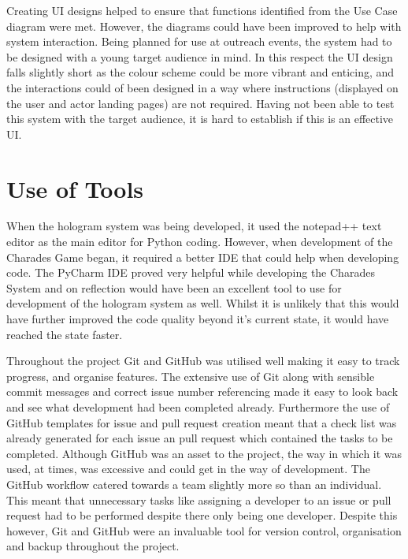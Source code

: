 Creating UI designs helped to ensure that functions identified from the Use Case diagram were met. However, the diagrams could have been improved to help with system interaction. Being planned for use at outreach events, the system had to be designed with a young target audience in mind. In this respect the UI design falls slightly short as the colour scheme could be more vibrant and enticing, and the interactions could of been designed in a way where instructions (displayed on the user and actor landing pages) are not required. Having not been able to test this system with the target audience, it is hard to establish if this is an effective UI.

\section{Use of Tools}
When the hologram system was being developed, it used the notepad++ text editor as the main editor for Python coding. However, when development of the Charades Game began, it required a better IDE that could help when developing code. The PyCharm IDE proved very helpful while developing the Charades System and on reflection would have been an excellent tool to use for development of the hologram system as well. Whilst it is unlikely that this would have further improved the code quality beyond it's current state, it would have reached the state faster.

Throughout the project Git and GitHub was utilised well making it easy to track progress, and organise features. The extensive use of Git along with sensible commit messages and correct issue number referencing made it easy to look back and see what development had been completed already. Furthermore the use of GitHub templates for issue and pull request creation meant that a check list was already generated for each issue an pull request which contained the tasks to be completed. Although GitHub was an asset to the project, the way in which it was used, at times, was excessive and could get in the way of development. The GitHub workflow catered towards a team slightly more so than an individual. This meant that unnecessary tasks like assigning a developer to an issue or pull request had to be performed despite there only being one developer. Despite this however, Git and GitHub were an invaluable tool for version control, organisation and backup throughout the project. 

